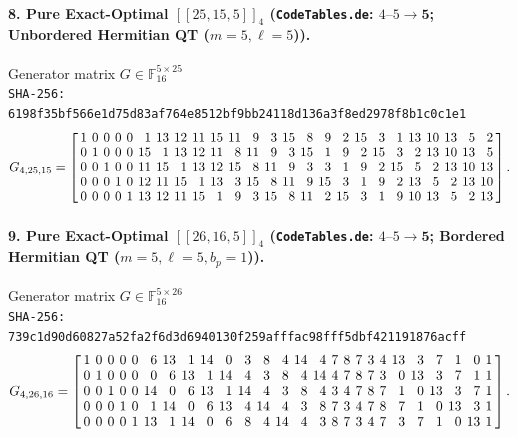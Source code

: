 \documentclass[11pt,a4paper]{article}
\theoremstyle{remark}
\begin{document}
\paragraph{8. Pure Exact-Optimal $[[25,15,5]]_{4}$ (\texttt{CodeTables.de}: $4\text{--}5 \to \mathbf{5}$; Unbordered Hermitian QT ($m=5, \ell=5$)).} Generator matrix $G \in \mathbb{F}_{16}^{5 \times 25}$\\
{\footnotesize\texttt{SHA-256: 6198f35bf566e1d75d83af764e8512bf9bb24118d136a3f8ed2978f8b1c0c1e1}}
{\scriptsize\[
G_{4,25,15} = \setlength{\arraycolsep}{1.95pt}\renewcommand{\arraystretch}{0.95}
\left[\begin{array}{*{25}{r}}
1 & 0 & 0 & 0 & 0 & 1 & 13 & 12 & 11 & 15 & 11 & 9 & 3 & 15 & 8 & 9 & 2 & 15 & 3 & 1 & 13 & 10 & 13 & 5 & 2 \\
0 & 1 & 0 & 0 & 0 & 15 & 1 & 13 & 12 & 11 & 8 & 11 & 9 & 3 & 15 & 1 & 9 & 2 & 15 & 3 & 2 & 13 & 10 & 13 & 5 \\
0 & 0 & 1 & 0 & 0 & 11 & 15 & 1 & 13 & 12 & 15 & 8 & 11 & 9 & 3 & 3 & 1 & 9 & 2 & 15 & 5 & 2 & 13 & 10 & 13 \\
0 & 0 & 0 & 1 & 0 & 12 & 11 & 15 & 1 & 13 & 3 & 15 & 8 & 11 & 9 & 15 & 3 & 1 & 9 & 2 & 13 & 5 & 2 & 13 & 10 \\
0 & 0 & 0 & 0 & 1 & 13 & 12 & 11 & 15 & 1 & 9 & 3 & 15 & 8 & 11 & 2 & 15 & 3 & 1 & 9 & 10 & 13 & 5 & 2 & 13
\end{array}\right].
\]}

\paragraph{9. Pure Exact-Optimal $[[26,16,5]]_{4}$ (\texttt{CodeTables.de}: $4\text{--}5 \to \mathbf{5}$; Bordered Hermitian QT ($m=5, \ell=5, b_p=1$)).} Generator matrix $G \in \mathbb{F}_{16}^{5 \times 26}$\\
{\footnotesize\texttt{SHA-256: 739c1d90d60827a52fa2f6d3d6940130f259afffac98fff5dbf421191876acff}}
{\scriptsize\[
G_{4,26,16} = \setlength{\arraycolsep}{1.95pt}\renewcommand{\arraystretch}{0.95}
\left[\begin{array}{*{26}{r}}
1 & 0 & 0 & 0 & 0 & 6 & 13 & 1 & 14 & 0 & 3 & 8 & 4 & 14 & 4 & 7 & 8 & 7 & 3 & 4 & 13 & 3 & 7 & 1 & 0 & 1 \\
0 & 1 & 0 & 0 & 0 & 0 & 6 & 13 & 1 & 14 & 4 & 3 & 8 & 4 & 14 & 4 & 7 & 8 & 7 & 3 & 0 & 13 & 3 & 7 & 1 & 1 \\
0 & 0 & 1 & 0 & 0 & 14 & 0 & 6 & 13 & 1 & 14 & 4 & 3 & 8 & 4 & 3 & 4 & 7 & 8 & 7 & 1 & 0 & 13 & 3 & 7 & 1 \\
0 & 0 & 0 & 1 & 0 & 1 & 14 & 0 & 6 & 13 & 4 & 14 & 4 & 3 & 8 & 7 & 3 & 4 & 7 & 8 & 7 & 1 & 0 & 13 & 3 & 1 \\
0 & 0 & 0 & 0 & 1 & 13 & 1 & 14 & 0 & 6 & 8 & 4 & 14 & 4 & 3 & 8 & 7 & 3 & 4 & 7 & 3 & 7 & 1 & 0 & 13 & 1
\end{array}\right].
\]}
\end{document}

